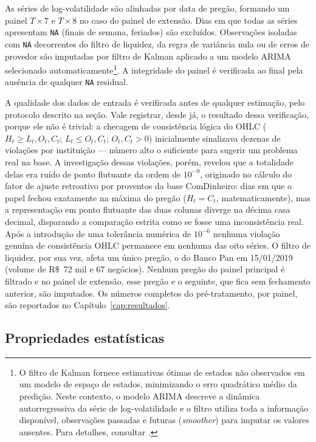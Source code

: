 \documentclass[12pt, a4paper, oneside, english, brazil]{abntex2}
\begin{document}
As séries de log-volatilidade são alinhadas por data de pregão, 
formando um painel $T \times 7$ e $T \times 8$ no caso do painel de extensão. Dias em que todas as séries apresentam \texttt{NA}
(finais de semana, feriados) são excluídos. Observações isoladas com \texttt{NA}
decorrentes do filtro de liquidez, da regra de variância nula ou de erros de provedor são imputadas por filtro de
Kalman aplicado a um modelo ARIMA selecionado automaticamente\footnote{O filtro de Kalman
fornece estimativas ótimas de estados não observados em um modelo de espaço de estados,
minimizando o erro quadrático médio da predição. Neste contexto, o modelo ARIMA descreve
a dinâmica autorregressiva da série de log-volatilidade e o filtro utiliza toda a
informação disponível, observações passadas e futuras (\textit{smoother}) para
imputar os valores ausentes. Para detalhes, consultar \textcite{moritz2017}.}.
A integridade do painel é verificada ao final pela ausência de qualquer \texttt{NA}
residual.


A qualidade dos dados de entrada é verificada antes de qualquer estimação,
pelo protocolo descrito na seção. Vale
registrar, desde já, o resultado dessa verificação, porque ele não é
trivial: a checagem de consistência lógica do OHLC ($H_t \geq L_t, O_t, C_t$;
$L_t \leq O_t, C_t$; $O_t, C_t > 0$) inicialmente sinalizava dezenas de
violações por instituição — número alto o suficiente para sugerir um
problema real na base. A investigação dessas violações, porém, revelou que
a totalidade delas era ruído de ponto flutuante da ordem de $10^{-9}$,
originado no cálculo do fator de ajuste retroativo por proventos da base
ComDinheiro: dias em que o papel fechou exatamente na máxima do pregão
($H_t = C_t$, matematicamente), mas a representação em ponto flutuante das
duas colunas diverge na décima casa decimal, disparando a comparação
estrita como se fosse uma inconsistência real. Após a introdução de uma
tolerância numérica de $10^{-6}$ nenhuma violação genuína de consistência OHLC
permanece em nenhuma das oito séries. O filtro de liquidez, por sua vez, afeta um único pregão, o do Banco Pan em
15/01/2019 (volume de R\$~72 mil e 67 negócios). Nenhum pregão do painel
principal é filtrado e no painel de extensão, esse pregão e o seguinte, que fica sem
fechamento anterior, são imputados. Os números completos do
pré-tratamento, por painel, são reportados no Capítulo~\ref{cap:resultados}.


\subsection*{Propriedades estatísticas}
\end{document}
